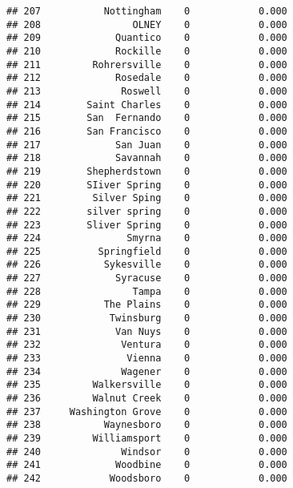 \documentclass[]{article}
\newenvironment{Shaded}{\begin{snugshade}}{\end{snugshade}}
\newcommand{\KeywordTok}[1]{\textcolor[rgb]{0.13,0.29,0.53}{\textbf{#1}}}
\newcommand{\DataTypeTok}[1]{\textcolor[rgb]{0.13,0.29,0.53}{#1}}
\newcommand{\DecValTok}[1]{\textcolor[rgb]{0.00,0.00,0.81}{#1}}
\newcommand{\StringTok}[1]{\textcolor[rgb]{0.31,0.60,0.02}{#1}}
\newcommand{\OperatorTok}[1]{\textcolor[rgb]{0.81,0.36,0.00}{\textbf{#1}}}
\newcommand{\NormalTok}[1]{#1}
\begin{document}
\begin{verbatim}
## 207           Nottingham    0            0.000
## 208                OLNEY    0            0.000
## 209             Quantico    0            0.000
## 210             Rockille    0            0.000
## 211         Rohrersville    0            0.000
## 212             Rosedale    0            0.000
## 213              Roswell    0            0.000
## 214        Saint Charles    0            0.000
## 215        San  Fernando    0            0.000
## 216        San Francisco    0            0.000
## 217             San Juan    0            0.000
## 218             Savannah    0            0.000
## 219        Shepherdstown    0            0.000
## 220        SIiver Spring    0            0.000
## 221         Silver Sping    0            0.000
## 222        silver spring    0            0.000
## 223        Sliver Spring    0            0.000
## 224               Smyrna    0            0.000
## 225          Springfield    0            0.000
## 226           Sykesville    0            0.000
## 227             Syracuse    0            0.000
## 228                Tampa    0            0.000
## 229           The Plains    0            0.000
## 230            Twinsburg    0            0.000
## 231             Van Nuys    0            0.000
## 232              Ventura    0            0.000
## 233               Vienna    0            0.000
## 234              Wagener    0            0.000
## 235         Walkersville    0            0.000
## 236         Walnut Creek    0            0.000
## 237     Washington Grove    0            0.000
## 238           Waynesboro    0            0.000
## 239         Williamsport    0            0.000
## 240              Windsor    0            0.000
## 241             Woodbine    0            0.000
## 242            Woodsboro    0            0.000
\end{verbatim}

\begin{Shaded}
\end{Shaded}
\end{document}
